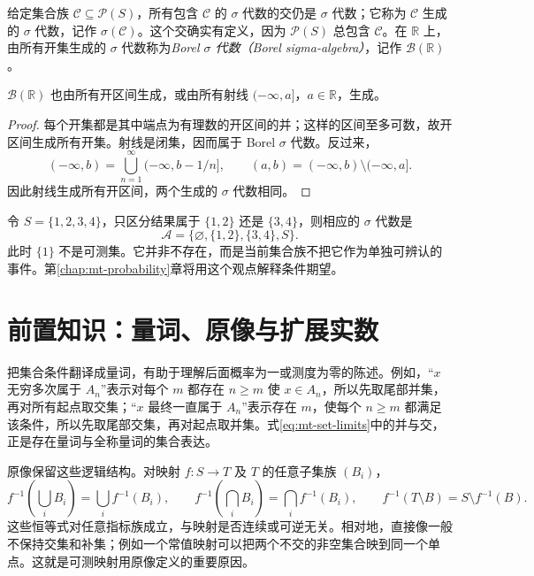给定集合族 $\mathcal C\subseteq\mathcal P(S)$，所有包含 $\mathcal C$ 的 $\sigma$ 代数的交仍是 $\sigma$ 代数；它称为 $\mathcal C$ 生成的 $\sigma$ 代数，记作 $\sigma(\mathcal C)$。这个交确实有定义，因为 $\mathcal P(S)$ 总包含 $\mathcal C$。在 $\mathbb R$ 上，由所有开集生成的 $\sigma$ 代数称为\emph{Borel $\sigma$ 代数（Borel sigma-algebra）}，记作 $\mathcal B(\mathbb R)$。

\begin{proposition}
$\mathcal B(\mathbb R)$ 也由所有开区间生成，或由所有射线 $(-\infty,a]$，$a\in\mathbb R$，生成。
\end{proposition}
\begin{proof}
每个开集都是其中端点为有理数的开区间的并；这样的区间至多可数，故开区间生成所有开集。射线是闭集，因而属于 Borel $\sigma$ 代数。反过来，
\[
 (-\infty,b)=\bigcup_{n=1}^{\infty}(-\infty,b-1/n],\qquad
 (a,b)=(-\infty,b)\setminus(-\infty,a].
\]
因此射线生成所有开区间，两个生成的 $\sigma$ 代数相同。
\end{proof}

\begin{example}[有限信息对应的集合族]
令 $S=\{1,2,3,4\}$，只区分结果属于 $\{1,2\}$ 还是 $\{3,4\}$，则相应的 $\sigma$ 代数是
\[
 \mathcal A=\{\varnothing,\{1,2\},\{3,4\},S\}.
\]
此时 $\{1\}$ 不是可测集。它并非不存在，而是当前集合族不把它作为单独可辨认的事件。第\ref{chap:mt-probability}章将用这个观点解释条件期望。
\end{example}

\section{前置知识：量词、原像与扩展实数}
\label{sec:mt-logical-tools}
把集合条件翻译成量词，有助于理解后面概率为一或测度为零的陈述。例如，“$x$ 无穷多次属于 $A_n$”表示对每个 $m$ 都存在 $n\geq m$ 使 $x\in A_n$，所以先取尾部并集，再对所有起点取交集；“$x$ 最终一直属于 $A_n$”表示存在 $m$，使每个 $n\geq m$ 都满足该条件，所以先取尾部交集，再对起点取并集。式\eqref{eq:mt-set-limits}中的并与交，正是存在量词与全称量词的集合表达。

原像保留这些逻辑结构。对映射 $f:S\to T$ 及 $T$ 的任意子集族 $(B_i)$，
\[
 f^{-1}\!\left(\bigcup_iB_i\right)=\bigcup_if^{-1}(B_i),\qquad
 f^{-1}\!\left(\bigcap_iB_i\right)=\bigcap_if^{-1}(B_i),\qquad
 f^{-1}(T\setminus B)=S\setminus f^{-1}(B).
\]
这些恒等式对任意指标族成立，与映射是否连续或可逆无关。相对地，直接像一般不保持交集和补集；例如一个常值映射可以把两个不交的非空集合映到同一个单点。这就是可测映射用原像定义的重要原因。


